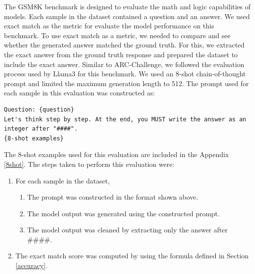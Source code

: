 The GSM8K benchmark is designed to evaluate the math and logic capabilities of models. Each sample in the dataset contained a question and an answer. We used exact match as the metric for evaluate the model performance on this benchmark. To use exact match as a metric, we needed to compare and see whether the generated answer matched the ground truth. For this, we extracted the exact answer from the ground truth response and prepared the dataset to include the exact answer. Similar to ARC-Challenge, we followed the evaluation process used by Llama3 for this benchmark. We used an 8-shot chain-of-thought prompt and limited the maximum generation length to 512. The prompt used for each sample in this evaluation was constructed as:
\begin{lstlisting}
Question: {question}
Let's think step by step. At the end, you MUST write the answer as an integer after "####".
{8-shot examples}
\end{lstlisting}
The 8-shot examples used for this evaluation are included in the Appendix \ref{8shot}. The steps taken to perform this evaluation were:
\begin{enumerate}
\item For each sample in the dataset,
\begin{enumerate} [label*=\arabic*.]
\item The prompt was constructed in the format shown above.
\item The model output was generated using the constructed prompt.
\item The model output was cleaned by extracting only the answer after \#\#\#\#.
\end{enumerate}
\item The exact match score was computed by using the formula defined in Section \ref{accuracy}.
\end{enumerate}


